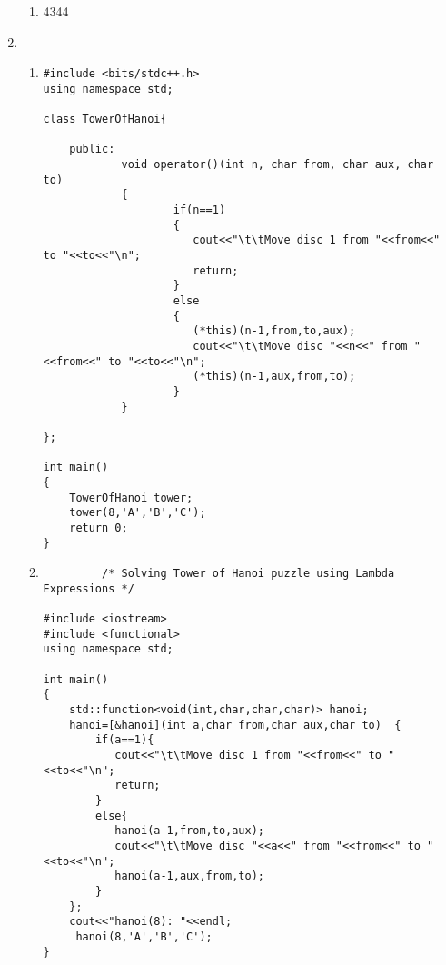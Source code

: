 \documentclass[11pt]{article}
\begin{document}
\begin{enumerate}
\begin{enumerate}
\item 4344
\end{enumerate}
\item
\begin{enumerate}
     \item \begin{lstlisting}
#include <bits/stdc++.h>
using namespace std;

class TowerOfHanoi{

    public:
            void operator()(int n, char from, char aux, char to)
            {
                    if(n==1)
                    {
                       cout<<"\t\tMove disc 1 from "<<from<<" to "<<to<<"\n";
                       return;
                    }
                    else
                    {
                       (*this)(n-1,from,to,aux);
                       cout<<"\t\tMove disc "<<n<<" from "<<from<<" to "<<to<<"\n";
                       (*this)(n-1,aux,from,to);
                    }
            }
        
};

int main()
{
    TowerOfHanoi tower;
    tower(8,'A','B','C');
    return 0;
}
     \end{lstlisting}

\item \begin{lstlisting}
         /* Solving Tower of Hanoi puzzle using Lambda Expressions */

#include <iostream>
#include <functional>
using namespace std;

int main()
{
    std::function<void(int,char,char,char)> hanoi;
    hanoi=[&hanoi](int a,char from,char aux,char to)  {
        if(a==1){
           cout<<"\t\tMove disc 1 from "<<from<<" to "<<to<<"\n";
           return;
        }
        else{
           hanoi(a-1,from,to,aux);
           cout<<"\t\tMove disc "<<a<<" from "<<from<<" to "<<to<<"\n";
           hanoi(a-1,aux,from,to);
        }
    };
    cout<<"hanoi(8): "<<endl;
     hanoi(8,'A','B','C');
}
     \end{lstlisting}
 \end{enumerate}
\end{enumerate}
\end{document}
